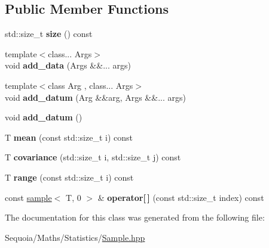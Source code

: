 \subsection*{Public Member Functions}
\begin{DoxyCompactItemize}
\item 
\mbox{\label{classsequoia_1_1maths_1_1statistics_1_1sample_afa64876ba0c22ea02b372c73e0d5a828}} 
std\+::size\+\_\+t {\bfseries size} () const
\item 
\mbox{\label{classsequoia_1_1maths_1_1statistics_1_1sample_a9745d5f12dabc534f04114c389317abf}} 
{\footnotesize template$<$class... Args$>$ }\\void {\bfseries add\+\_\+data} (Args \&\&... args)
\item 
\mbox{\label{classsequoia_1_1maths_1_1statistics_1_1sample_a8d9f49084e73eaf2935bce9ed5b41863}} 
{\footnotesize template$<$class Arg , class... Args$>$ }\\void {\bfseries add\+\_\+datum} (Arg \&\&arg, Args \&\&... args)
\item 
\mbox{\label{classsequoia_1_1maths_1_1statistics_1_1sample_a0dfbd08035c0c1fdf8b4817116996542}} 
void {\bfseries add\+\_\+datum} ()
\item 
\mbox{\label{classsequoia_1_1maths_1_1statistics_1_1sample_a86207a6742341686a876bda72af38ab4}} 
T {\bfseries mean} (const std\+::size\+\_\+t i) const
\item 
\mbox{\label{classsequoia_1_1maths_1_1statistics_1_1sample_aee23ec2be60a48c9ecbf6779c7ade2a0}} 
T {\bfseries covariance} (std\+::size\+\_\+t i, std\+::size\+\_\+t j) const
\item 
\mbox{\label{classsequoia_1_1maths_1_1statistics_1_1sample_a928463fa58e1f0a80fc47cfd8b27c0dd}} 
T {\bfseries range} (const std\+::size\+\_\+t i) const
\item 
\mbox{\label{classsequoia_1_1maths_1_1statistics_1_1sample_a75715d106195365b08ae63f6da219fa2}} 
const \mbox{\hyperlink{classsequoia_1_1maths_1_1statistics_1_1sample}{sample}}$<$ T, 0 $>$ \& {\bfseries operator\mbox{[}$\,$\mbox{]}} (const std\+::size\+\_\+t index) const
\end{DoxyCompactItemize}


The documentation for this class was generated from the following file\+:\begin{DoxyCompactItemize}
\item 
Sequoia/\+Maths/\+Statistics/\mbox{\hyperlink{_sample_8hpp}{Sample.\+hpp}}\end{DoxyCompactItemize}
